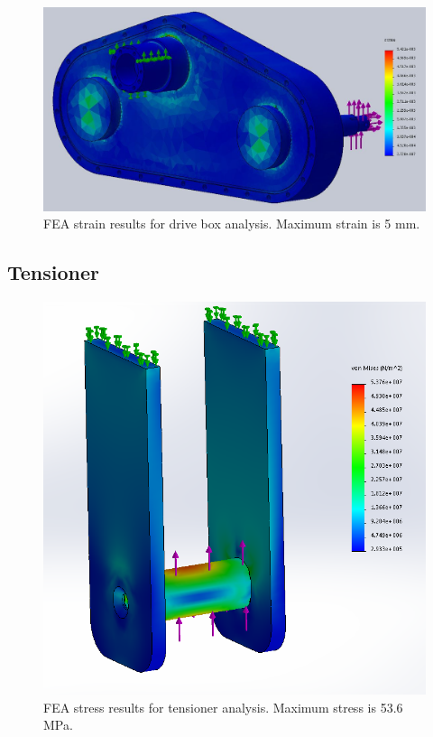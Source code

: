 \begin{figure}[H]
\centering
\includegraphics[width=\textwidth]{images/drive_box_strain_fea}
\caption[Drive Box FEA Strain Results]{FEA strain results for drive box analysis. Maximum strain is 5 mm.}
\label{fig:box_fea2}
\end{figure}

\subsection{Tensioner}\label{sec:idler_fea}

\begin{figure}[H]
\centering
\includegraphics[width=\textwidth]{images/tensioner_vonmises_fea}
\caption[Tensioner FEA Stress Results]{FEA stress results for tensioner analysis. Maximum stress is 53.6 MPa.}
\label{fig:idler_fea1}
\end{figure}

